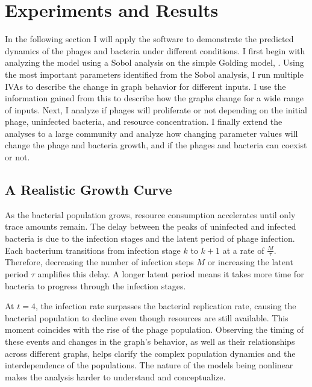 \chapter{Experiments and Results}
\label{AER}

In the following section I will apply the software to demonstrate the predicted dynamics of the phages and bacteria under different conditions. 
I first begin with analyzing the model using a Sobol analysis on the simple Golding model, . 
Using the most important parameters identified from the Sobol analysis, I run multiple IVAs to describe the change in graph behavior for different inputs. 
I use the information gained from this to describe how the graphs change for a wide range of inputs. 
Next, I analyze if phages will proliferate or not depending on the initial phage, uninfected bacteria, and resource concentration. 
I finally extend the analyses to a large community and analyze how changing parameter values will change the phage and bacteria growth, and if the phages and bacteria can coexist or not. 

\section{A Realistic Growth Curve}
As the bacterial population grows, resource consumption accelerates until only trace amounts remain. 
The delay between the peaks of uninfected and infected bacteria is due to the infection stages and the latent period of phage infection. 
Each bacterium transitions from infection stage $k$ to $k+1$ at a rate of $\frac{M}{\tau}$. 
Therefore, decreasing the number of infection steps $M$ or increasing the latent period $\tau$ amplifies this delay. 
A longer latent period means it takes more time for bacteria to progress through the infection stages.

At $t=4$, the infection rate surpasses the bacterial replication rate, causing the bacterial population to decline even though resources are still available. 
This moment coincides with the rise of the phage population. 
Observing the timing of these events and changes in the graph's behavior, as well as their relationships across different graphs, helps clarify the complex population dynamics and the interdependence of the populations. 
The nature of the models being nonlinear makes the analysis harder to understand and conceptualize. 

